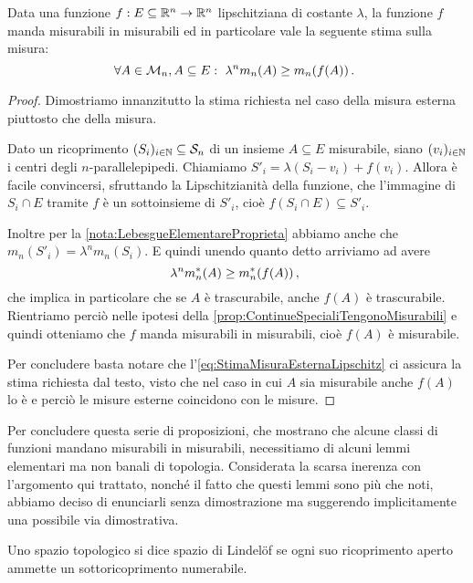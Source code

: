 \begin{proposition}\label{prop:LipschitzTengonoMisurabili}
	Data una funzione $f:E\subseteq \mathbb R^n\to\mathbb R^n$ lipschitziana di costante $\lambda$, la funzione $f$ manda misurabili in misurabili ed in particolare vale la seguente stima sulla misura:
	\begin{equation*}
		\forall A\in\mathcal M_n, A\subseteq E:\ \lambda^n m_n(A) \ge m_n(f(A)) \, \text{. }
	\end{equation*}
\end{proposition}
\begin{proof}
	Dimostriamo innanzitutto la stima richiesta nel caso della misura esterna piuttosto che della misura.
	
	Dato un ricoprimento $(S_i)_{i\in\mathbb N}\subseteq \mathcal S_n$ di un insieme $A\subseteq E$ misurabile, siano $(v_i)_{i\in\mathbb N}$ i centri degli $n$-parallelepipedi.
	Chiamiamo $S'_i=\lambda(S_i-v_i)+f(v_i)$.
	Allora è facile convincersi, sfruttando la Lipschitzianità della funzione, che l'immagine di $S_i\cap E$ tramite $f$ è un sottoinsieme di $S'_i$, cioè $f(S_i\cap E)\subseteq S'_i$.
	
	Inoltre per la \cref{nota:LebesgueElementareProprieta} abbiamo anche che $m_n(S'_i)=\lambda^n m_n(S_i)$. 
	E quindi unendo quanto detto arriviamo ad avere
	\begin{equation}\label{eq:StimaMisuraEsternaLipschitz}
		\lambda^n m_n^*(A) \ge m_n^*(f(A))  \, \text{, }
	\end{equation}
	che implica in particolare che se $A$ è trascurabile, anche $f(A)$ è trascurabile.
	Rientriamo perciò nelle ipotesi della \cref{prop:ContinueSpecialiTengonoMisurabili} e quindi otteniamo che $f$ manda misurabili in misurabili, cioè $f(A)$ è misurabile.
	
	Per concludere basta notare che l'\cref{eq:StimaMisuraEsternaLipschitz} ci assicura la stima richiesta dal testo, visto che nel caso in cui $A$ sia misurabile anche $f(A)$ lo è e perciò le misure esterne coincidono con le misure.
\end{proof}

Per concludere questa serie di proposizioni, che mostrano che alcune classi di funzioni mandano misurabili in misurabili, necessitiamo di alcuni lemmi elementari ma non banali di topologia.
Considerata la scarsa inerenza con l'argomento qui trattato, nonché il fatto che questi lemmi sono più che noti, abbiamo deciso di enunciarli senza dimostrazione ma suggerendo implicitamente una possibile via dimostrativa.

\begin{definition}\label{def:Lindelof}
	Uno spazio topologico si dice spazio di Lindelöf se ogni suo ricoprimento aperto ammette un sottoricoprimento numerabile. 
\end{definition}

